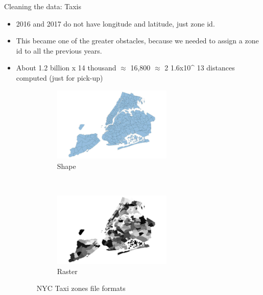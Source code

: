 \documentclass[10pt,ignorenonframetext,]{beamer}
\providecommand{\tightlist}{%
  \setlength{\itemsep}{0pt}\setlength{\parskip}{0pt}}
\begin{document}
\begin{frame}

\begin{block}{Cleaning the data: Taxis}

\begin{itemize}[<+->]
\tightlist
\item
  2016 and 2017 do not have longitude and latitude, just zone id.
\item
  This became one of the greater obstacles, because we needed to assign
  a zone id to all the previous years.
\item
  About 1.2 billion x 14 thousand \(\approx\) 16,800 \(\approx\) 2
  1.6x10\^{} 13 distances computed (just for pick-up)

  \begin{figure}
  \label{fig:zones}
  \centering
  \begin{subfigure}[t]{0.45\textwidth}
  \centering
  \label{fig:zones_shape}
  \includegraphics[height=1.4in]{../latex/images/taxi_zones_shape}
  \caption{Shape}
  \end{subfigure}%
  ~ 
  \begin{subfigure}[t]{0.45\textwidth}
  \centering
  \label{fig:zones_raster}
  \includegraphics[height=1.4in]{../latex/images/taxi_zones_raster}
  \caption{Raster}
  \end{subfigure}
  \caption{NYC Taxi zones file formats}
  \end{figure}
\end{itemize}

\end{block}

\end{frame}
\end{document}
